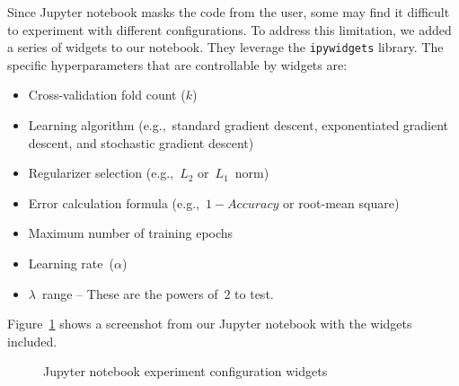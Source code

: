 \documentclass{report}
\begin{document}
  Since Jupyter notebook masks the code from the user, some may find it difficult to experiment with different configurations.  To address this limitation, we added a series of widgets to our notebook.  They leverage the \texttt{ipywidgets} library.  The specific hyperparameters that are controllable by widgets are:
  
  \begin{itemize}
    \setlength\itemsep{0pt}
    \item Cross-validation fold count ($k$)
    \item Learning algorithm (e.g.,~standard gradient descent, exponentiated gradient descent, and stochastic gradient descent)
    \item Regularizer selection (e.g.,~$L_2$ or~$L_1$~norm)
    \item Error calculation formula (e.g.,~$1 - Accuracy$ or root-mean square)
    \item Maximum number of training epochs
    \item Learning rate~($\alpha$)
    \item $\lambda$~range -- These are the powers of~$2$ to test.
  \end{itemize}
  
  Figure~\ref{fig:jupyterWidgets} shows a screenshot from our Jupyter notebook with the widgets included.
    
  \begin{figure}[tb]
    \centering
    \caption{Jupyter notebook experiment configuration widgets}\label{fig:jupyterWidgets}
  \end{figure}
\end{document}
